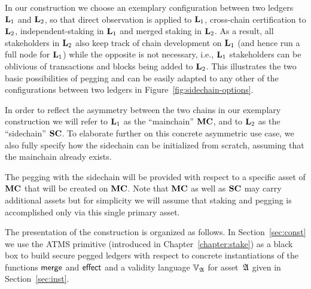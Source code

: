In our construction we choose an exemplary
configuration between two ledgers $\Ledger_1$ and
$\Ledger_2$, so that direct observation is applied to $\Ledger_1$,
cross-chain certification to $\Ledger_2$, independent-staking in $\Ledger_1$ and
merged staking in $\Ledger_2$.
As a result, all stakeholders in $\Ledger_2$ also keep track
of chain development on $\Ledger_1$ (and hence run a full node for $\Ledger_1$)
while the opposite is not necessary, i.e.,
$\Ledger_1$ stakeholders can be oblivious of transactions and
blocks being added to $\Ledger_2$.
This illustrates the two basic possibilities
of pegging and can be easily adapted
to  any other of the configurations between two ledgers in Figure~\ref{fig:sidechain-options}.

In order to reflect the asymmetry between the two chains in our exemplary
construction we will refer to $\Ledger_1$ as the ``mainchain'' $\Mainchain$, and to
$\Ledger_2$ as the ``sidechain'' $\Sidechain$. To elaborate further on this concrete
asymmetric use case, we also fully specify how the sidechain can be
initialized from scratch, assuming that the mainchain already exists.



The pegging with the sidechain will be provided with respect to a specific asset of $\Mainchain$
that will be created on $\Mainchain$.
Note that $\Mainchain$ as well as $\Sidechain$ may carry
additional assets but for simplicity we will assume that staking and pegging is
accomplished only via this single primary asset.

The presentation of the construction is organized as follows.
In Section~\ref{sec:const} we use the ATMS primitive (introduced in
Chapter~\ref{chapter:stake}) as a black box to build secure
pegged ledgers with respect to concrete instantiations of the functions $\merge$
and $\effect$ and a validity language $\adalang$ for asset~$\ada$ given in Section~\ref{sec:inst}.
